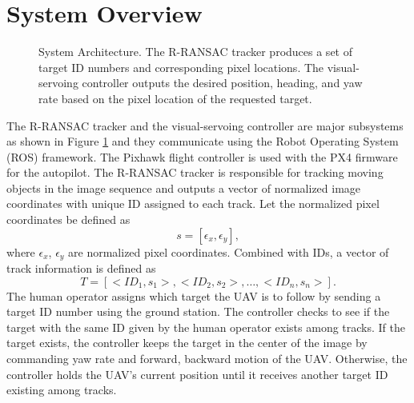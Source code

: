 \section{System Overview}
\begin{figure}[htbp]
	\centering
	\caption{System Architecture. The R-RANSAC tracker produces a set of target ID numbers and corresponding pixel locations. The visual-servoing controller outputs the desired position, heading, and yaw rate based on the pixel location of the requested target.}
	\label{system}
\end{figure}
The R-RANSAC tracker and the visual-servoing controller are major subsystems as shown in Figure \ref{system} and they communicate using the Robot Operating System (ROS) framework. The Pixhawk flight controller is used with the PX4 firmware for the autopilot. The R-RANSAC tracker is responsible for tracking moving objects in the image sequence and outputs a vector of normalized image coordinates with unique ID assigned to each track. Let the normalized pixel coordinates be defined as 
\begin{equation}
s = [\epsilon_x, \epsilon_y],
\end{equation} where $\epsilon_x$, $\epsilon_y$ are normalized pixel coordinates. Combined with IDs, a vector of track information is defined as 
\begin{equation}
T = [<ID_1, s_1>, <ID_2, s_2>, \dots, <ID_n, s_n>].
\end{equation}
The human operator assigns which target the UAV is to follow by sending a target ID number using the ground station. The controller checks to see if the target with the same ID given by the human operator exists among tracks. If the target exists, the controller keeps the target in the center of the image by commanding yaw rate and forward, backward motion of the UAV. Otherwise, the controller holds the UAV's current position until it receives another target ID existing among tracks. 

